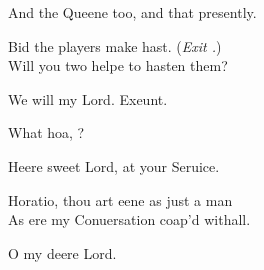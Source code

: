 \documentclass[a5paper,DIV=calc,11pt]{scrbook}
\begin{document}
\begin{drama*}
    \polspeaks And the Queene too, and that presently.
    
    \hamspeaks Bid the players make hast. \hfill(\textit{Exit \pol.})\\
    Will you two helpe to hasten them?
    
     We will my Lord. Exeunt.
    
    
    \hamspeaks What hoa, \hor?
    
    \horspeaks Heere sweet Lord, at your Seruice.
    
    \hamspeaks Horatio, thou art eene as just a man\\
    As ere my Conuersation coap'd withall.
    
    \horspeaks O my deere Lord.
    

\end{drama*}
\end{document}
